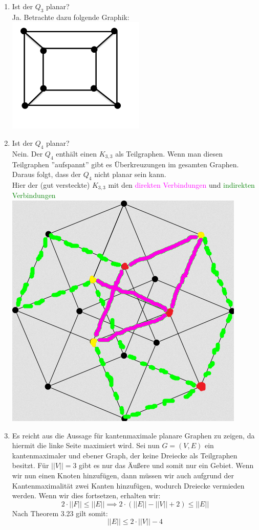 \begin{enumerate}[label=(\alph*)]
        \item Ist der $Q_3$ planar? \\
        Ja. Betrachte dazu folgende Graphik:\\
        \includegraphics[width=0.3\linewidth]{Q3}
        
        \item Ist der $Q_4$ planar?\\
        Nein. Der $Q_4$ enthält einen $K_{3,3}$ als Teilgraphen. Wenn man diesen Teilgraphen ''aufspannt'' 
        gibt es Überkreuzungen im gesamten Graphen. Daraus folgt, dass der $Q_4$ nicht planar sein kann. \\
        Hier der (gut versteckte) $K_{3,3}$ mit den \textcolor{magenta}{direkten Verbindungen} und \textcolor{green}{indirekten Verbindungen} \\ \includegraphics{Q4}
        
        \item Es reicht aus die Aussage für kantenmaximale planare Graphen zu zeigen, da hiermit die 
        linke Seite maximiert wird. Sei nun $G=(V,E)$ ein kantenmaximaler und ebener Graph, der keine 
        Dreiecke als Teilgraphen besitzt. Für $||V||=3$ gibt es nur das Äußere und somit nur ein Gebiet. 
        Wenn wir nun einen Knoten hinzufügen, dann müssen wir auch aufgrund der Kantenmaximalität zwei 
        Kanten hinzufügen, wodurch Dreiecke vermieden werden.  Wenn wir dies fortsetzen, erhalten wir:
        $$ 2 \cdot ||F|| \le ||E||\implies 2 \cdot \left(||E|| - ||V|| + 2 \right) \le ||E||$$
        Nach Theorem 3.23 gilt somit:
        $$||E|| \le 2 \cdot ||V|| - 4 $$ 
        

\end{enumerate}
